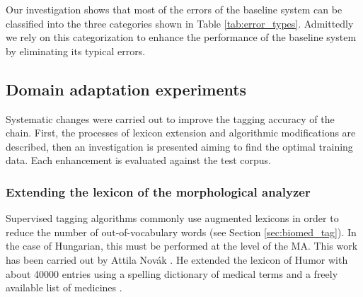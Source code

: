 Our investigation shows that most of the errors of the baseline system can be classified into the three categories shown in Table \ref{tab:error_types}. Admittedly we rely on this categorization to enhance the performance of the baseline system by eliminating its typical errors.

\subsection{Domain adaptation experiments}

Systematic changes were carried out to improve the tagging accuracy of the chain. First, the processes of lexicon extension and algorithmic modifications are described, then an investigation is presented aiming to find the optimal training data. Each enhancement is evaluated against the test corpus.

\subsubsection{Extending the lexicon of the morphological analyzer}
\label{sec:ma-extension}

Supervised tagging algorithms commonly use augmented lexicons in order to reduce the number of out-of-vocabulary words (see Section \ref{sec:biomed_tag}). In the case of Hungarian, this must be performed at the level of the MA. This work has been carried out by Attila Novák \cite{}. He extended the lexicon of Humor with about 40000 entries using a spelling dictionary of medical terms \cite{Fabian1992} and a freely available list of medicines \cite{Foigazgatosag2012}.

